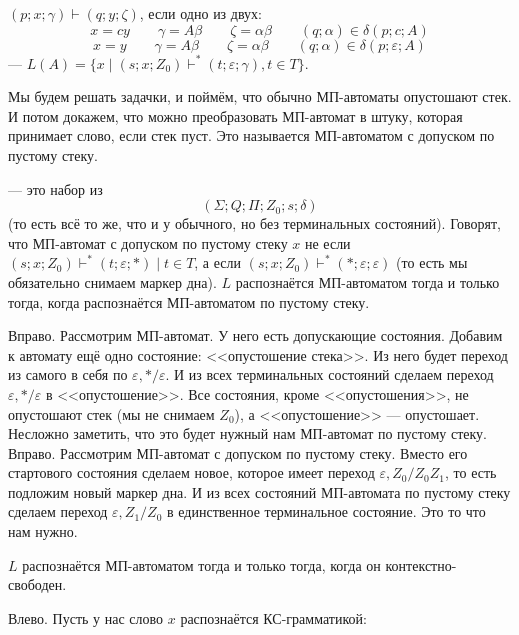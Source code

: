 \documentclass{article}
\begin{document}
\begin{itemize}
        \dfn $(p;x;\gamma)\vdash(q;y;\zeta)$, если одно из двух:
        $$
        x=cy\qquad\gamma=A\beta\qquad\zeta=\alpha\beta\qquad(q;\alpha)\in\delta(p;c;A)
        $$
        $$
        x=y\qquad\gamma=A\beta\qquad\zeta=\alpha\beta\qquad(q;\alpha)\in\delta(p;\varepsilon;A)
        $$
        \dfn {} --- $L(A)=\{x\mid(s;x;Z_0)\vdash^*(t;\varepsilon;\gamma),t\in T\}$.
        \begin{Comment}
            Мы будем решать задачки, и поймём, что обычно МП-автоматы опустошают стек. И потом докажем, что можно преобразовать МП-автомат в штуку, которая принимает слово, если стек пуст. Это называется МП-автоматом с допуском по пустому стеку.
        \end{Comment}
        \dfn {} --- это набор из
        $$
        (\Sigma;Q;\Pi;Z_0;s;\delta)
        $$
        (то есть всё то же, что и у обычного, но без терминальных состояний).
        \dfn Говорят, что МП-автомат с допуском по пустому стеку  $x$ не если $(s;x;Z_0)\vdash^*(t;\varepsilon;*)\mid t\in T$, а если $(s;x;Z_0)\vdash^*(*;\varepsilon;\varepsilon)$ (то есть мы обязательно снимаем маркер дна).
        \thm $L$ распознаётся МП-автоматом тогда и только тогда, когда распознаётся МП-автоматом по пустому стеку.
        \begin{Proof}
            Вправо. Рассмотрим МП-автомат. У него есть допускающие состояния. Добавим к автомату ещё одно состояние: <<опустошение стека>>. Из него будет переход из самого в себя по $\varepsilon,*/\varepsilon$. И из всех терминальных состояний сделаем переход $\varepsilon,*/\varepsilon$ в <<опустошение>>. Все состояния, кроме <<опустошения>>, не опустошают стек (мы не снимаем $Z_0$), а <<опустошение>> --- опустошает. Несложно заметить, что это будет нужный нам МП-автомат по пустому стеку.\\
            Вправо. Рассмотрим МП-автомат с допуском по пустому стеку. Вместо его стартового состояния сделаем новое, которое имеет переход $\varepsilon,Z_0/Z_0Z_1$, то есть подложим новый маркер дна. И из всех состояний МП-автомата по пустому стеку сделаем переход $\varepsilon,Z_1/Z_0$ в единственное терминальное состояние. Это то что нам нужно.
        \end{Proof}
        \thm $L$ распознаётся МП-автоматом тогда и только тогда, когда он контекстно-свободен.
        \begin{Proof}
            Влево. Пусть у нас слово $x$ распознаётся КС-грамматикой:

\end{Proof}
\end{itemize}
\end{document}
